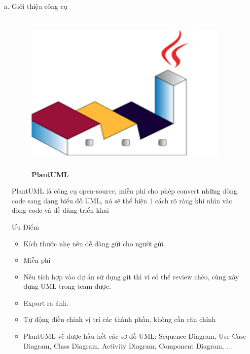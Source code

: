 \begin{enumerate}[a)]



  \item  Giới thiệu công cụ


\begin{figure}[H]
  \centering
  \includegraphics[width=10cm,height=8cm]{Images/appendix/plantuml.png}
  \caption[PlantUML]{\bfseries \fontsize{12pt}{0pt}
  \selectfont PlantUML}
  \label{plantuml} %
\end{figure}


PlantUML là công cụ open-source, miễn phí cho phép convert những dòng code sang dạng biểu đồ UML, nó sẽ thể hiện 1 cách rõ ràng khi nhìn vào dòng code và dễ dàng triển khai


Ưu Điểm
\begin{adjustwidth}{2em}{}
  \begin{itemize}
      \item Kích thước nhẹ nên dễ dàng gửi cho người gửi.
  
      \item 	Miễn phí
      \item 	Nếu tích hợp vào dự án sử dụng git thì vì có thể review chéo, cùng xây dựng UML trong team được.
      \item 	Export ra ảnh.
      \item 	Tự động điều chỉnh vị trí các thành phần, không cần căn chỉnh
      \item 	PlantUML vẽ được hầu hết các sơ đồ UML: Sequence Diagram, Use Case Diagram, Class Diagram, Activity Diagram, Component Diagram, ...
      
  \end{itemize}
\end{adjustwidth}





\end{enumerate}
